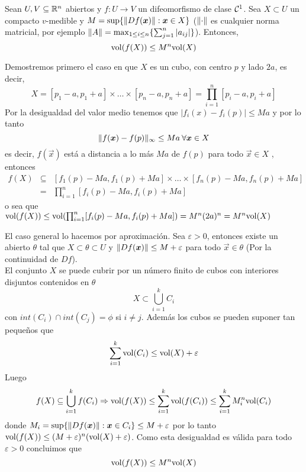 \begin{lema} Sean $U,V\subseteq \mathbb{R}^n$ abiertos y $f:U\to V$ un
difeomorfismo de clase ${\cal{C}}^1$. Sea $X\subset U$ un compacto
$v$-medible y $M=\sup\{\lVert Df(\boldsymbol{x})\rVert : \boldsymbol{x}\in X\}$ ($\lVert\cdot\rVert$
es cualquier norma matricial, por ejemplo $\lVert A\rVert=\max_{1\leq
i\leq n}\{\sum_{j=1}^n|a_{ij}|\}$). Entonces,
\[{\rm vol}(f(X))\leq M^n{\rm vol}(X)\]
\end{lema}

\begin{demostracion}
Demostremos primero el caso en que $X$ es un
cubo, con centro $p$ y lado $2a$, es decir,
\[X=[p_1-a,p_1+a]\times \ldots\times [p_n-a,p_n+a]=\prod_{i=1}^n
[p_i-a,p_i+a]\] Por la desigualdad del valor medio tenemos que
$|f_i(x)-f_i(p)|\leq Ma$ y por lo tanto
\[\lVert f(\boldsymbol{x})-f(p)\rVert_{\infty}\leq Ma\:\forall \boldsymbol{x} \in X\]
es decir, $f(\vec{x})$ est\'a a distancia a lo m\'as $Ma$ de $f(p)$ para
todo $\vec{x}\in X$ , entonces
\begin{eqnarray*}
f(X)&\subseteq& [f_1(p)-Ma,f_1(p)+Ma]\times \ldots \times
[f_n(p)-Ma,f_n(p)+Ma]\\
&=&\prod_{i=1}^n [f_i(p)-Ma,f_i(p)+Ma]
\end{eqnarray*}
 o sea
que ${\rm vol}(f(X))\leq {\rm vol}(\prod_{i=1}^n
[f_i(p)-Ma,f_i(p)+Ma])=M^n(2a)^n=M^n {\rm vol}(X)$

\medskip

El caso general lo hacemos por aproximaci\'on. Sea $\varepsilon >0$, entonces
existe un abierto $\theta$ tal que $X\subset \theta\subset U$ y
$\lVert Df(\boldsymbol{x})\rVert\leq M+\varepsilon$ para todo $\vec{x}\in \theta$ (Por la
continuidad de $Df$).\\ El conjunto $X$ se puede cubrir por un
n\'umero finito de cubos con interiores disjuntos contenidos en
$\theta$
\[X\subset \bigcup_{i=1}^k C_i\]
con $int(C_i)\cap int(C_j)=\phi$ si $i\neq j$. Adem\'as los cubos
se pueden suponer tan peque\~nos que
\[\sum_{i=1}^k {\rm vol}(C_i)\leq {\rm vol}(X)+\varepsilon\]
Luego
\[f(X)\subseteq\bigcup_{i=1}^k f(C_i)\Rightarrow
{\rm vol}(f(X))\leq\sum_{i=1}^k {\rm vol}(f(C_i))\leq\sum_{i=1}^k
M_i^n {\rm vol}(C_i)\] donde $M_i=\sup\{\lVert Df(\boldsymbol{x})\rVert : \boldsymbol{x}\in
C_i\}\leq M+\varepsilon$ por lo tanto ${\rm vol}(f(X))\leq
(M+\varepsilon)^n({\rm vol}(X)+\varepsilon)$. Como esta desigualdad es v\'alida
para todo $\varepsilon>0$ concluimos que
\[{\rm vol}(f(X))\leq M^n {\rm vol}(X)\]
\end{demostracion}

